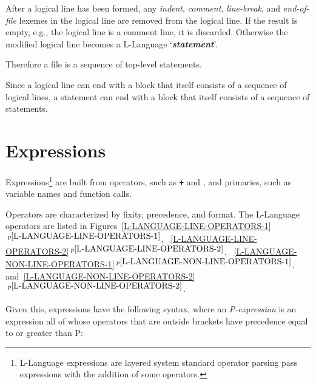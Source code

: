 \documentclass[12pt]{article}
\newcommand{\TT}[1]{{\tt \bfseries #1}}
\newcommand{\emkey}[1]{{\em \bfseries #1}}
\newcommand{\itemref}[1]{\ref{#1}$\,^{p\pageref{#1}}$}
\begin{document}
After a logical line
has been formed, any {\em indent},
{\em comment}, {\em line-break}, and {\em end-of-file}
lexemes in the logical line
are removed from the logical line.  If the result is
empty, e.g., the logical line is a comment line, it is discarded.
Otherwise the
modified logical line becomes a L-Language
`\emkey{statement}'\label{STATEMENT}.

Therefore a file is a sequence of top-level statements.

Since a logical line can end with a block that itself consists
of a sequence of logical lines, a statement can end with
a block that itself consists of a sequence of statements.

\newpage

\section{Expressions}

Expressions\footnote{
L-Language expressions are
layered system standard operator parsing pass
expressions with the addition of some
operators.}
are built from operators, such as \TT{+} and \TT{*},
and primaries, such as variable names and function calls.

Operators are characterized by fixity, precedence, and format.
The L-Language operators are listed in
Figures~\itemref{L-LANGUAGE-LINE-OPERATORS-1},
~\itemref{L-LANGUAGE-LINE-OPERATORS-2},
~\itemref{L-LANGUAGE-NON-LINE-OPERATORS-1},
and~\itemref{L-LANGUAGE-NON-LINE-OPERATORS-2}.


Given this, expressions have the following syntax,
where an {\em P-expression}
is an expression all of whose operators that are outside brackets
have precedence equal to or greater than P:
\end{document}
